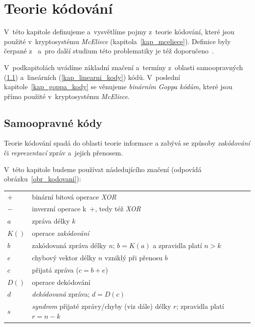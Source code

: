 \documentclass[thesis=M,czech,hidelinks]{FITthesis}[2012/06/26]
\newcommand{\0}{{\textcolor[gray]{0.75}{0}}}
\begin{document}
\chapter{Teorie kódování}\label{kap_kody}

V~této kapitole definujeme a~vysvětlíme pojmy z~teorie kódování, které jsou
použité v~kryptosystému \emph{McEliece} (kapitola~\ref{kap_mceliece}). Definice
byly čerpané z~\cite{FIT_AAK,Adamek} a~pro další studium této problematiky je
též doporučeno~\cite{McEliece_coding}.

V~podkapitolách uvádíme základní značení a~termíny z~oblasti samoopravných
(\ref{kap_samoopravne_kody}) a~lineárních (\ref{kap_linearni_kody}) kódů.
V~poslední kapitole~\ref{kap_goppa_kody} se věnujeme \emph{binárním Goppa
kódům}, které jsou přímo použité v~kryptosystému \emph{McEliece}.

\section{Samoopravné kódy}\label{kap_samoopravne_kody}

Teorie kódování spadá do oblasti teorie informace a zabývá se způsoby
\emph{zakódování} či \emph{reprezentací} zpráv a~jejich přenosem.

V~této kapitole budeme používat následujícího značení (odpovídá
obrázku~\ref{obr_kodovani}):

\begin{center}
\begin{tabular}{l p{10cm}}
    $+$     &   binární bitová operace \emph{XOR} \\
    $-$     &   inverzní operace k~$+$, tedy též \emph{XOR} \\
    $a$     &   zpráva délky $k$ \\
    $K()$   &   operace \emph{zakódování} \\
    $b$     &   zakódovaná zpráva délky $n$; $b=K(a)$ a zpravidla platí $n>k$ \\
    $e$     &   chybový vektor délky $n$ vzniklý při přenosu $b$ \\
    $c$     &   přijatá zpráva ($c=b+e$) \\
    $D()$   &   operace dekódování \\
    $d$     &   \emph{dekódovaná} zpráva; $d=D(c)$ \\
    $s$     &   \emph{syndrom} přijaté zprávy/chyby (viz dále) délky $r$;
                zpravidla platí $r=n-k$ \\
\end{tabular}
\end{center}
\end{document}
